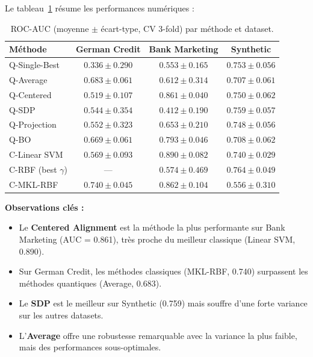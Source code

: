 \documentclass[12pt,a4paper]{article}
\begin{document}
Le tableau~\ref{tab:mkl_results} résume les performances numériques :

\begin{table}[H]
\centering
\caption{ROC-AUC (moyenne $\pm$ écart-type, CV 3-fold) par méthode et dataset.}
\label{tab:mkl_results}
\small
\begin{tabular}{lccc}
\toprule
\textbf{Méthode} & \textbf{German Credit} & \textbf{Bank Marketing} & \textbf{Synthetic} \\
\midrule
Q-Single-Best    & $0.336 \pm 0.290$ & $0.553 \pm 0.165$ & $0.753 \pm 0.056$ \\
Q-Average        & $0.683 \pm 0.061$ & $0.612 \pm 0.314$ & $0.707 \pm 0.061$ \\
Q-Centered       & $0.519 \pm 0.107$ & $\mathbf{0.861 \pm 0.040}$ & $0.750 \pm 0.062$ \\
Q-SDP            & $0.544 \pm 0.354$ & $0.412 \pm 0.190$ & $\mathbf{0.759 \pm 0.057}$ \\
Q-Projection     & $0.552 \pm 0.323$ & $0.653 \pm 0.210$ & $0.748 \pm 0.056$ \\
Q-BO             & $0.669 \pm 0.061$ & $0.793 \pm 0.046$ & $0.708 \pm 0.062$ \\
\midrule
C-Linear SVM     & $0.569 \pm 0.093$ & $\mathbf{0.890 \pm 0.082}$ & $0.740 \pm 0.029$ \\
C-RBF (best $\gamma$) & --- & $0.574 \pm 0.469$ & $0.764 \pm 0.049$ \\
C-MKL-RBF        & $\mathbf{0.740 \pm 0.045}$ & $0.862 \pm 0.104$ & $0.556 \pm 0.310$ \\
\bottomrule
\end{tabular}
\end{table}

\textbf{Observations clés :}
\begin{itemize}[noitemsep]
    \item Le \textbf{Centered Alignment} est la méthode la plus performante sur Bank Marketing (AUC = 0.861), très proche du meilleur classique (Linear SVM, 0.890).
    \item Sur German Credit, les méthodes classiques (MKL-RBF, 0.740) surpassent les méthodes quantiques (Average, 0.683).
    \item Le \textbf{SDP} est le meilleur sur Synthetic (0.759) mais souffre d'une forte variance sur les autres datasets.
    \item L'\textbf{Average} offre une robustesse remarquable avec la variance la plus faible, mais des performances sous-optimales.
\end{itemize}
\end{document}
